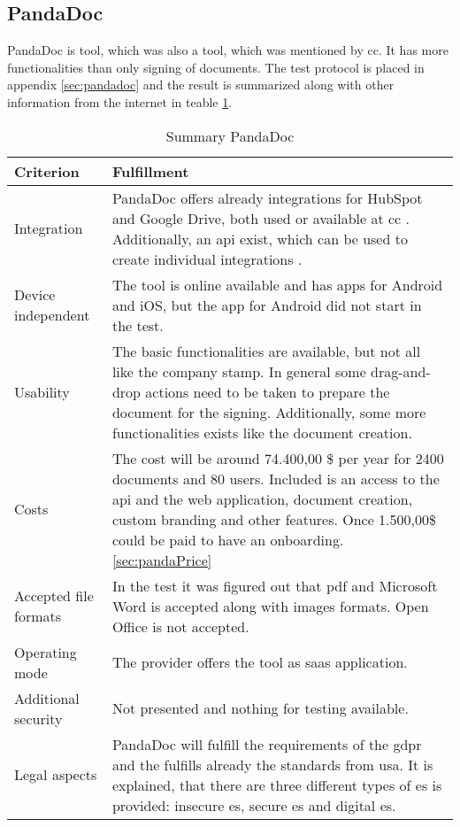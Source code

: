\subsection{PandaDoc}
PandaDoc is tool, which was also a tool, which was mentioned by \gls{cc}. It has more functionalities than only signing of documents. The test protocol is placed in appendix \ref{sec:pandadoc} and the result is summarized along with other information from the internet in teable \ref{tab:pandadoc}. 
\begin{table}[h!]
	\begin{tabular}{|p{4cm}|p{10cm}|} \hline
		Criterion & Fulfillment \\ \hline
		Integration & PandaDoc offers already integrations for HubSpot and Google Drive, both used or available at \gls{cc} \parencite{pandadoc2018integration}. Additionally, an \gls{api} exist, which can be used to create individual integrations \parencite{pandadoc2018api}. \\ \hline
		Device independent & The tool is online available and has \glspl{app} for Android and iOS, but the \gls{app} for Android did not start in the test. \\ \hline
		Usability & The basic functionalities are available, but not all like the company stamp. In general some drag-and-drop actions need to be taken to prepare the document for the signing. Additionally, some more functionalities exists like the document creation.\\ \hline
		Costs & The cost will be around 74.400,00 \$ per year for 2400 documents and 80 users. Included is an access to the \gls{api} and the web application, document creation, custom branding and other features. Once 1.500,00\$ could be paid to have an onboarding.  \ref{sec:pandaPrice} \\ \hline
		Accepted file formats & In the test it was figured out that \gls{pdf} and Microsoft Word is accepted along with images formats. Open Office is not accepted. \\ \hline
		Operating mode & The provider offers the tool as \gls{saas} application. \parencite{pandadoc2018saas} \\ \hline
		Additional security & Not presented and nothing for testing available. \\ \hline
		Legal aspects & PandaDoc will fulfill the requirements of the \gls{gdpr} and the fulfills already the standards from \gls{usa}. It is explained, that there are three different types of \gls{es} is provided: insecure \gls{es}, secure \gls{es} and digital \gls{es}.  \parencite{pandadoc2018gdp,pandadoc2018legal} \\ \hline
	\end{tabular}
	\caption{Summary PandaDoc}
	\label{tab:pandadoc}
\end{table}

